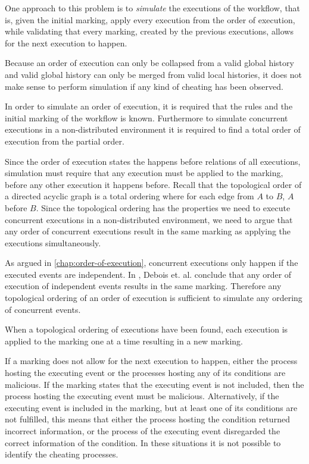     \newpar One approach to this problem is to \textit{simulate} the executions of the workflow, that is, given the initial marking, apply every execution from the order of execution, while validating that every marking, created by the previous executions, allows for the next execution to happen.
    
    \newpar Because an order of execution can only be collapsed from a valid global history and valid global history can only be merged from valid local histories, it does not make sense to perform simulation if any kind of cheating has been observed.
    
    \newpar In order to simulate an order of execution, it is required that the rules and the initial marking of the workflow is known. Furthermore to simulate concurrent executions in a non-distributed environment it is required to find a total order of execution from the partial order.
    
    \newpar
	Since the order of execution states the happens before relations of all executions, simulation must require that any execution must be applied to the marking, before any other execution it happens before. Recall that the topological order of a directed acyclic graph is a total ordering where for each edge from $A$ to $B$, $A$ before $B$. Since the topological ordering has the properties we need to execute concurrent executions in a non-distributed environment, we need to argue that any order of concurrent executions result in the same marking as applying the executions simultaneously.
	
	As argued in \autoref{chap:order-of-execution}, concurrent executions only happen if the executed events are independent. In \cite{debois2015concurrency}, Debois et. al. conclude that any order of execution of independent events results in the same marking. Therefore any topological ordering of an order of execution is sufficient to simulate any ordering of concurrent events.
    
    When a topological ordering of executions have been found, each execution is applied to the marking one at a time resulting in a new marking.
    
    \newpar If a marking does not allow for the next execution to happen, either the process hosting the executing event or the processes hosting any of its conditions are malicious. If the marking states that the executing event is not included, then the process hosting the executing event must be malicious. Alternatively, if the executing event is included in the marking, but at least one of its conditions are not fulfilled, this means that either the process hosting the condition returned incorrect information, or the process of the executing event disregarded the correct information of the condition. In these situations it is not possible to identify the cheating processes.

